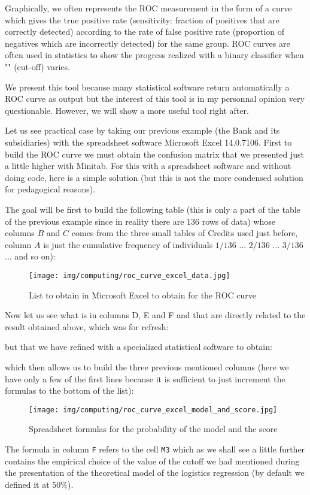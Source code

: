 	Graphically, we often represents the ROC measurement  in the form of a curve which gives the true positive rate (sensitivity: fraction of positives that are correctly detected) according to the rate of false positive rate (proportion of negatives which are incorrectly detected) for the same group. ROC curves are often used in statistics to show the progress realized with a binary classifier when "" (cut-off) varies.
	\begin{tcolorbox}[title=Remark,colframe=black,arc=10pt]
	We present this tool because many statistical software return automatically a ROC curve as output but the interest of this tool is in my personnal opinion very questionable. However, we will show a more useful tool right after.
	\end{tcolorbox}
	Let us see practical case by taking our previous example (the Bank and its subsidiaries) with the spreadsheet software Microsoft Excel 14.0.7106. First to build the ROC curve we must obtain the confusion matrix that we presented just a little higher with Minitab. For this with a spreadsheet software and without doing code, here is a simple solution (but this is not the more condensed solution for pedagogical reasons).
	
	The goal will be first to build the following table (this is only a part of the table of the previous example since in reality there are 136 rows of data) whose columns $B$ and $C$ comes from the three small tables of Credits used just before, column $A$ is just the cumulative frequency of individuals $1/136$ ... $2/136$ ... $3/136$ ... and so on):
	\begin{figure}[H]
		\centering
		\texttt{[image: img/computing/roc\_curve\_excel\_data.jpg]}
		\caption{List to obtain in Microsoft Excel to obtain for the ROC curve}
	\end{figure}
	Now let us see what is in columns D, E and F and that are directly related to the result obtained above, which was for refresh:
	
	but that we have refined with a specialized statistical software to obtain:
	
	which then allows us to build the three previous mentioned columns (here we have only a few of the first lines because it is sufficient to just increment the formulas to the bottom of the list):
	\begin{figure}[H]
		\centering
		\texttt{[image: img/computing/roc\_curve\_excel\_model\_and\_score.jpg]}
		\caption{Spreadsheet formulas for the probability of the model and the score}
	\end{figure}
	The formula in column \texttt{F} refers to the cell \texttt{M3} which as we shall see a little further contains the empirical choice of the value of the cutoff we had mentioned during the presentation of the theoretical model of the logistics regression (by default we defined it at $50\%$).
	
